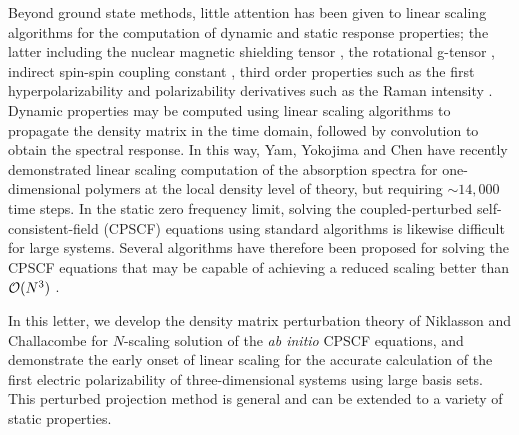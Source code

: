 \documentclass[prl,aps,twocolumn,showpacs,twocolumngrid,superbib]{revtex4}
\begin{document}
Beyond ground state methods, little attention has been given 
to linear scaling algorithms for the computation of dynamic and static response 
properties; the latter including the nuclear magnetic shielding tensor \cite{Pulay_1990}, 
the rotational g-tensor \cite{Helgaker_1996}, indirect spin-spin coupling constant 
\cite{Pennington_1991,Malkin_1996}, third order  properties such as the first hyperpolarizability 
\cite{Franky_1997} and polarizability derivatives such as the Raman intensity 
\cite{Lazzeri_2003,Champagne_2001}.  Dynamic  properties may be computed using linear scaling algorithms to propagate the density matrix \cite{SNomura97,CYam03} in 
the time domain, followed by convolution to obtain the spectral response.  In this way, 
Yam, Yokojima and Chen \cite{CYam03} have recently demonstrated linear scaling 
computation of the absorption spectra for one-dimensional polymers at the local 
density level of theory, but requiring $\sim 14,000$ time steps.  In the static zero frequency limit, 
solving the coupled-perturbed self-consistent-field (CPSCF) equations using standard algorithms is likewise difficult for
large systems.
Several algorithms have therefore been proposed for solving the CPSCF equations 
that may be capable of achieving a reduced scaling better than ${\cal O}(N^3)$ 
\cite{COchsenfeld97,HLarsen01a}.  

In this letter, we develop the density matrix perturbation theory of Niklasson and Challacombe 
\cite{ANiklasson04} for $N$-scaling solution of the {\em ab initio} CPSCF equations, and 
demonstrate the early onset of linear scaling for the accurate calculation of the first electric 
polarizability of three-dimensional systems using large basis sets. This perturbed projection 
method is general and can be extended to a variety of static properties.
\end{document}
